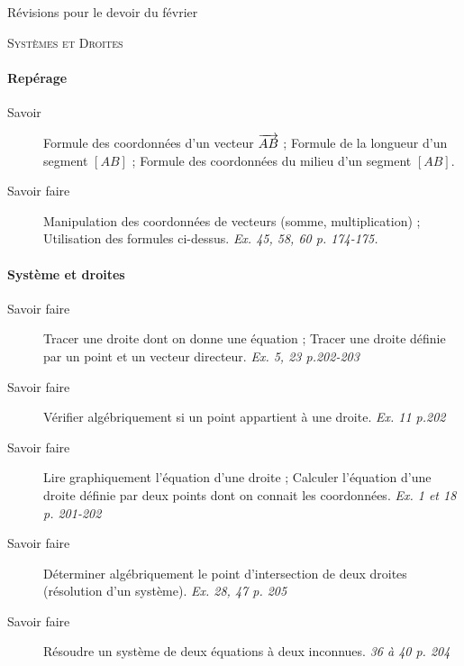 \documentclass[10pt]{article}
\begin{document}
\begin{center}
  Révisions pour le devoir du \hspace{1cm} février

  \textsc{Systèmes et Droites}
\end{center}

\paragraph{Repérage}
\begin{description}
  \item[Savoir] Formule des coordonnées d'un vecteur $\overrightarrow{AB}$ ; Formule de la longueur d'un segment $[AB]$ ; Formule des coordonnées du milieu d'un segment $[AB]$.
  \item[Savoir faire] Manipulation des coordonnées de vecteurs (somme, multiplication) ; Utilisation des formules ci-dessus. \emph{Ex. 45, 58, 60 p. 174-175.}
\end{description}

\paragraph{Système et droites}
\begin{description}
  \item[Savoir faire] Tracer une droite dont on donne une équation ; Tracer une droite définie par un point et un vecteur directeur. \emph{Ex. 5, 23 p.202-203}
  \item[Savoir faire] Vérifier algébriquement si un point appartient à une droite. \emph{Ex. 11 p.202}
  \item[Savoir faire] Lire graphiquement l'équation d'une droite ; Calculer l'équation d'une droite définie par deux points dont on connait les coordonnées. \emph{Ex. 1 et 18 p. 201-202}
  \item[Savoir faire] Déterminer algébriquement le point d'intersection de deux droites (résolution d'un système). \emph{Ex. 28, 47 p. 205}
  \item[Savoir faire] Résoudre un système de deux équations à deux inconnues. \emph{36 à 40 p. 204}
\end{description}
\end{document}
